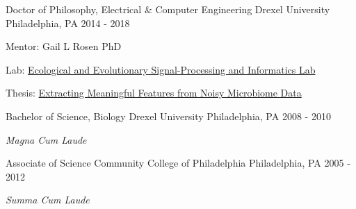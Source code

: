 \begin{cventries}
  \cventry
    {Doctor of Philosophy, Electrical \& Computer Engineering} %
    {Drexel University} %
    {Philadelphia, PA} %
    {2014 - 2018} %
    {
      \begin{cvitems} %
         \item Mentor: Gail L Rosen PhD
         \item Lab: \href{http://drexeleesi.com/}{Ecological and Evolutionary Signal-Processing and Informatics Lab}
	 \item Thesis: \href{https://idea.library.drexel.edu/islandora/object/idea\%3A8189}{Extracting Meaningful Features from Noisy Microbiome Data}
      \end{cvitems}
    }
    
  \cventry
    {Bachelor of Science, Biology} %
    {Drexel University} %
    {Philadelphia, PA} %
    {2008 - 2010} %
    {
      \begin{cvitems} %
         \item \textit{Magna Cum Laude}
      \end{cvitems}
    }
    
  \cventry
    {Associate of Science} %
    {Community College of Philadelphia} %
    {Philadelphia, PA} %
    {2005 - 2012} %
    {
      \begin{cvitems} %
         \item \textit{Summa Cum Laude}
      \end{cvitems}
    }

\end{cventries}
